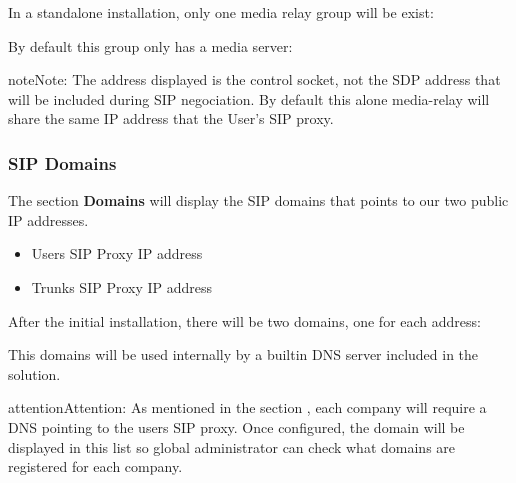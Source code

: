 \documentclass[letterpaper,10pt,english]{sphinxmanual}
\begin{document}
In a standalone installation, only one media relay group will be exist:

\noindent{}

By default this group only has a media server:

\noindent{}

\begin{notice}{note}{Note:}
The address displayed is the control socket, not the SDP address that
will be included during SIP negociation. By default this alone media-relay
will share the same IP address that the User's SIP proxy.
\end{notice}


\subsubsection{SIP Domains}
\label{internal_calls/god_portal:sip-domains}\label{internal_calls/god_portal:god-sipdomains}
The section \textbf{Domains} will display the SIP domains that points to our two
public IP addresses.
\begin{itemize}
\item {} 
Users SIP Proxy IP address

\item {} 
Trunks SIP Proxy IP address

\end{itemize}

After the initial installation, there will be two domains, one for each address:

\noindent{}

This domains will be used internally by a builtin DNS server included in the
solution.

\begin{notice}{attention}{Attention:}
As mentioned in the section {\hyperref[internal_calls/brand_portal:domain\string-per\string-company]{}}, each
company will require a DNS pointing to the users SIP proxy. Once configured,
the domain will be displayed in this list so global administrator can check
what domains are registered for each company.
\end{notice}
\end{document}
